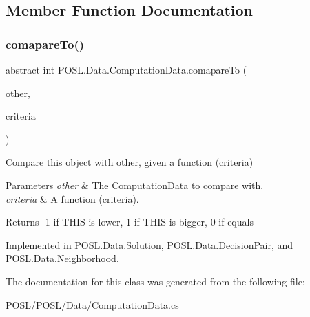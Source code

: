 \subsection{Member Function Documentation}
\mbox{\label{classPOSL_1_1Data_1_1ComputationData_a6cca889bb4ce32104d91dba413ef8c56}} 
\subsubsection{\texorpdfstring{comapare\+To()}{comapareTo()}}
{\footnotesize\ttfamily abstract int P\+O\+S\+L.\+Data.\+Computation\+Data.\+comapare\+To (\begin{DoxyParamCaption}\item[{\hyperlink{classPOSL_1_1Data_1_1ComputationData}{Computation\+Data}}]{other,  }\item[{Func$<$ \hyperlink{classPOSL_1_1Data_1_1ComputationData}{Computation\+Data}, int $>$}]{criteria }\end{DoxyParamCaption})\hspace{0.3cm}{\ttfamily [pure virtual]}}



Compare this object with other, given a function (criteria) 


\begin{DoxyParams}{Parameters}
{\em other} & The \hyperlink{classPOSL_1_1Data_1_1ComputationData}{Computation\+Data} to compare with. \\
\hline
{\em criteria} & A function (criteria). \\
\hline
\end{DoxyParams}
\begin{DoxyReturn}{Returns}
-\/1 if T\+H\+IS is lower, 1 if T\+H\+IS is bigger, 0 if equals 
\end{DoxyReturn}


Implemented in \hyperlink{classPOSL_1_1Data_1_1Solution_a17d810433104964cc43bf65f35d25cc7}{P\+O\+S\+L.\+Data.\+Solution}, \hyperlink{classPOSL_1_1Data_1_1DecisionPair_a86eb9f86339a60733443d1fd1332913d}{P\+O\+S\+L.\+Data.\+Decision\+Pair}, and \hyperlink{classPOSL_1_1Data_1_1Neighborhood_aa7014a3cbaf532f49d89468c20b7c269}{P\+O\+S\+L.\+Data.\+Neighborhood}.



The documentation for this class was generated from the following file\+:\begin{DoxyCompactItemize}
\item 
P\+O\+S\+L/\+P\+O\+S\+L/\+Data/Computation\+Data.\+cs\end{DoxyCompactItemize}
